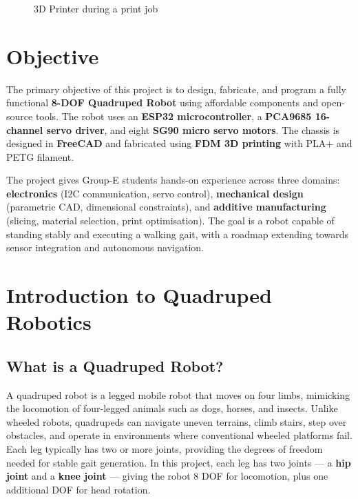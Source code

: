 \documentclass[12pt, a4paper]{article}
\begin{document}
\begin{figure}[p]
  \centering
  \vspace{10cm}
  \vspace*{\fill}
  \vspace{10cm}
  \caption{3D Printer during a print job}
  \label{fig:printer}
\end{figure}

\clearpage
\section{Objective}

The primary objective of this project is to design, fabricate, and program a
fully functional \textbf{8-DOF Quadruped Robot} using affordable components and
open-source tools. The robot uses an \textbf{ESP32 microcontroller}, a
\textbf{PCA9685 16-channel servo driver}, and eight \textbf{SG90 micro servo
motors}. The chassis is designed in \textbf{FreeCAD} and fabricated using
\textbf{FDM 3D printing} with PLA+ and PETG filament.

The project gives Group-E students hands-on experience across three domains:
\textbf{electronics} (I2C communication, servo control), \textbf{mechanical
design} (parametric CAD, dimensional constraints), and \textbf{additive
manufacturing} (slicing, material selection, print optimisation). The goal is a
robot capable of standing stably and executing a walking gait, with a roadmap
extending towards sensor integration and autonomous navigation.

\section{Introduction to Quadruped Robotics}

\subsection{What is a Quadruped Robot?}

A quadruped robot is a legged mobile robot that moves on four limbs, mimicking
the locomotion of four-legged animals such as dogs, horses, and insects. Unlike
wheeled robots, quadrupeds can navigate uneven terrains, climb stairs, step over
obstacles, and operate in environments where conventional wheeled platforms fail.
Each leg typically has two or more joints, providing the degrees of freedom
needed for stable gait generation. In this project, each leg has two joints ---
a \textbf{hip joint} and a \textbf{knee joint} --- giving the robot 8 DOF for
locomotion, plus one additional DOF for head rotation.
\end{document}

